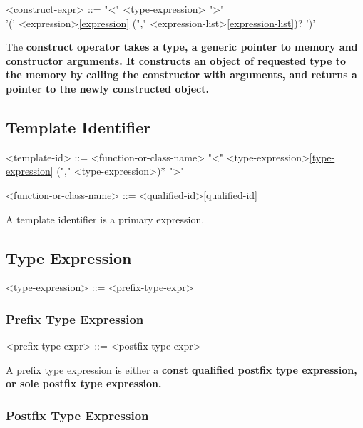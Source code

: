 \documentclass[a4paper,oneside,11pt]{article}
\begin{document}
\begin{grammar}
\label{construct-expr}<construct-expr> ::=  "<" <type-expression> ">"\\
'(' <expression>\ref{expression} ("," <expression-list>\ref{expression-list})? ')'

\end{grammar}

The \bf{construct} operator takes a type, a generic pointer to memory and constructor arguments.
It constructs an object of requested type to the memory by calling the constructor with arguments,
and returns a pointer to the newly constructed object.

\subsection{Template Identifier}\label{sec:templateid}
\begin{grammar}
\label{template-id}<template-id> ::= <function-or-class-name> "<" <type-expression>\ref{type-expression} ("," <type-expression>)* ">"

<function-or-class-name> ::= <qualified-id>\ref{qualified-id}
\end{grammar}

A template identifier is a primary expression.

\subsection{Type Expression}\label{sec:typeexpr}

\begin{grammar}
\label{type-expression}<type-expression> ::= <prefix-type-expr>
\end{grammar}

\subsubsection{Prefix Type Expression}

\begin{grammar}
<prefix-type-expr> ::=  <postfix-type-expr>
\end{grammar}

A prefix type expression is either a \bf{const} qualified postfix type expression,
or sole postfix type expression.

\subsubsection{Postfix Type Expression}\label{sec:postfixtypeexpr}
\end{document}
